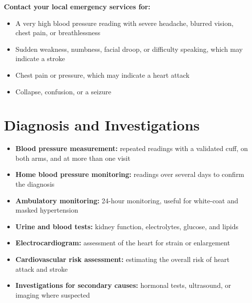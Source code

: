 \textbf{Contact your local emergency services for:}
\begin{itemize}
    \item A very high blood pressure reading with severe headache, blurred vision, chest pain, or breathlessness
    \item Sudden weakness, numbness, facial droop, or difficulty speaking, which may indicate a stroke
    \item Chest pain or pressure, which may indicate a heart attack
    \item Collapse, confusion, or a seizure
\end{itemize}

\section*{Diagnosis and Investigations}
\begin{itemize}
    \item \textbf{Blood pressure measurement:} repeated readings with a validated cuff, on both arms, and at more than one visit
    \item \textbf{Home blood pressure monitoring:} readings over several days to confirm the diagnosis
    \item \textbf{Ambulatory monitoring:} 24-hour monitoring, useful for white-coat and masked hypertension
    \item \textbf{Urine and blood tests:} kidney function, electrolytes, glucose, and lipids
    \item \textbf{Electrocardiogram:} assessment of the heart for strain or enlargement
    \item \textbf{Cardiovascular risk assessment:} estimating the overall risk of heart attack and stroke
    \item \textbf{Investigations for secondary causes:} hormonal tests, ultrasound, or imaging where suspected
\end{itemize}

